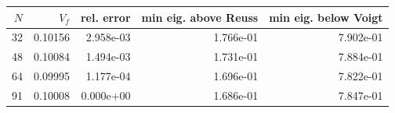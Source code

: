 \begin{tabular}{rrrrr}
\toprule
$N$ & $V_f$ & rel. error & min eig. above Reuss & min eig. below Voigt \\
\midrule
32 & 0.10156 & 2.958e-03 & 1.766e-01 & 7.902e-01 \\
48 & 0.10084 & 1.494e-03 & 1.731e-01 & 7.884e-01 \\
64 & 0.09995 & 1.177e-04 & 1.696e-01 & 7.822e-01 \\
91 & 0.10008 & 0.000e+00 & 1.686e-01 & 7.847e-01 \\
\bottomrule
\end{tabular}
